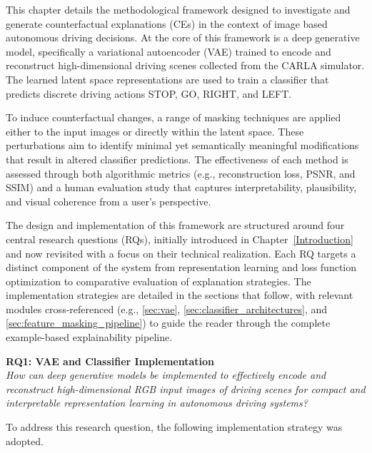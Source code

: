This chapter details the methodological framework designed to investigate and generate counterfactual explanations (CEs) in the context of image based autonomous driving decisions. At the core of this framework is a deep generative model, specifically a variational autoencoder (VAE) trained to encode and reconstruct high-dimensional driving scenes collected from the CARLA simulator. The learned latent space representations are used to train a classifier that predicts discrete driving actions STOP, GO, RIGHT, and LEFT.

To induce counterfactual changes, a range of masking techniques are applied either to the input images or directly within the latent space. These perturbations aim to identify minimal yet semantically meaningful modifications that result in altered classifier predictions. The effectiveness of each method is assessed through both algorithmic metrics (e.g., reconstruction loss, PSNR, and SSIM) and a human evaluation study that captures interpretability, plausibility, and visual coherence from a user’s perspective.

The design and implementation of this framework are structured around four central research questions (RQs), initially introduced in Chapter~\ref{Introduction} and now revisited with a focus on their technical realization. Each RQ targets a distinct component of the system from representation learning and loss function optimization to comparative evaluation of explanation strategies. The implementation strategies are detailed in the sections that follow, with relevant modules cross-referenced (e.g., \cref{sec:vae}, \cref{sec:classifier_architectures}, and \cref{sec:feature_masking_pipeline}) to guide the reader through the complete example-based explainability pipeline.

\vspace{1em}

\textbf{RQ1: VAE and Classifier Implementation} \\
\textit{How can deep generative models be implemented to effectively encode and reconstruct high-dimensional RGB input images of driving scenes for compact and interpretable representation learning in autonomous driving systems?}

To address this research question, the following implementation strategy was adopted.

\vspace{-1em}

